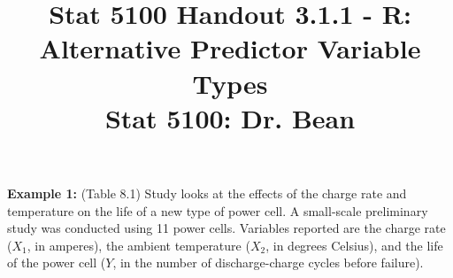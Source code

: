 \documentclass{article}\usepackage[]{graphicx}\usepackage[]{color}
\begin{document}
\title{%
  Stat 5100 Handout 3.1.1 - R: Alternative Predictor Variable Types \\
  \smallskip
  \large Stat 5100: Dr. Bean
}
\date{}

\maketitle

\textbf{Example 1:} (Table 8.1)  Study looks at the effects of the charge rate and temperature on the life of a new type of power cell.  A small-scale preliminary study was conducted using 11 power cells.  Variables reported are the charge rate ($X_1$, in amperes), the ambient temperature ($X_2$, in degrees Celsius), and the life of the power cell ($Y$, in the number of discharge-charge cycles before failure).
\end{document}
